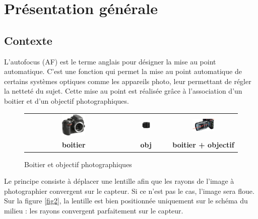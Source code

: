 
\section{Présentation générale}

\subsection{Contexte}\label{contexte}


L'autofocus (AF) est le terme anglais pour désigner la mise au point
automatique. C'est une fonction qui permet la mise au point automatique
de certains systèmes optiques comme les appareils photo, leur permettant
de régler la netteté du sujet. Cette mise au point est réalisée grâce à
l'association d'un boitier et d'un objectif photographiques.

\begin{figure}[!htb]
\begin{center}
\begin{tabular}{ccc}
\includegraphics[width=0.25\textwidth]{images/image6.jpeg}
&
\includegraphics[width=0.21\textwidth]{images/image7.png}
&
\includegraphics[width=0.35\textwidth]{images/image8.png}
\\
\textbf{boitier}& \textbf{obj}& \textbf{boitier + objectif}
\end{tabular}
\caption{Boitier et objectif photographiques \label{fig1}}
\end{center}
\end{figure}
\vspace{-.5cm}


Le principe consiste à déplacer une lentille afin que les rayons de
l'image à photographier convergent sur le capteur. Si ce n'est pas le
cas, l'image sera floue. Sur la figure \ref{fig2}, la lentille est bien positionnée uniquement sur le schéma du milieu :
les rayons convergent parfaitement sur le capteur.


